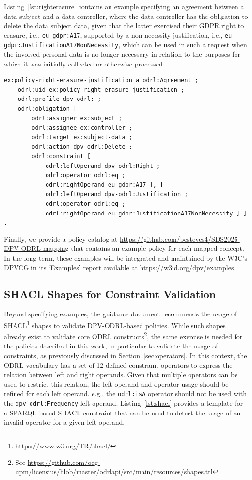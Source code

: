 Listing~\ref{lst:righterasure} contains an
example specifying an agreement between
a data subject and
a data controller,
where the data controller has the obligation
to delete the data subject data,
given that the latter exercised their
GDPR right to erasure, i.e., \texttt{eu-gdpr:A17},
supported by a non-necessity justification,
i.e., \texttt{eu-gdpr:JustificationA17NonNecessity},
which can be used in such a request
when the involved personal data is no longer necessary
in relation to the purposes for which it was initially collected
or otherwise processed.

\begin{scriptsize}
\begin{lstlisting}[language=turtle, caption=Obligation-based policy for the exercising of a right and related justification., label=lst:righterasure]
ex:policy-right-erasure-justification a odrl:Agreement ;
    odrl:uid ex:policy-right-erasure-justification ;
    odrl:profile dpv-odrl: ;
    odrl:obligation [
        odrl:assigner ex:subject ;
        odrl:assignee ex:controller ;
        odrl:target ex:subject-data ;
        odrl:action dpv-odrl:Delete ;
        odrl:constraint [
            odrl:leftOperand dpv-odrl:Right ;
            odrl:operator odrl:eq ;
            odrl:rightOperand eu-gdpr:A17 ], [
            odrl:leftOperand dpv-odrl:Justification ;
            odrl:operator odrl:eq ;
            odrl:rightOperand eu-gdpr:JustificationA17NonNecessity ] ] .
\end{lstlisting}
\end{scriptsize}

Finally,
we provide a policy catalog at
\url{https://github.com/besteves4/SDS2026-DPV-ODRL-mapping}
that contains an example policy for each mapped concept.
In the long term,
these examples will be integrated and maintained by the W3C's DPVCG
in its `Examples' report
available at \url{https://w3id.org/dpv/examples}.

\subsection{SHACL Shapes for Constraint Validation}
\label{sec:shacl}

Beyond specifying examples,
the guidance document
recommends the usage of SHACL\footnote{
    \url{https://www.w3.org/TR/shacl/}
} shapes
to validate DPV-ODRL-based policies.
While such shapes already exist
to validate core ODRL constructs\footnote{See \url{
    https://github.com/oeg-upm/licensius/blob/master/odrlapi/src/main/resources/shapes.ttl}},
the same exercise is needed for
the policies described in this work,
in particular to validate the usage of constraints,
as previously discussed in Section~\ref{sec:operators}.
In this context,
the ODRL vocabulary has a set of 12
defined constraint operators to express
the relation between left and right operands.
Given that multiple operators
can be used to restrict this relation,
the left operand and operator usage
should be refined for each left operand,
e.g., the \texttt{odrl:isA} operator
should not be used with the
\texttt{dpv-odrl:Frequency} left operand.
Listing~\ref{lst:shacl}
provides a template 
for a SPARQL-based SHACL constraint
that can be used to
detect the usage of an invalid operator
for a given left operand.

